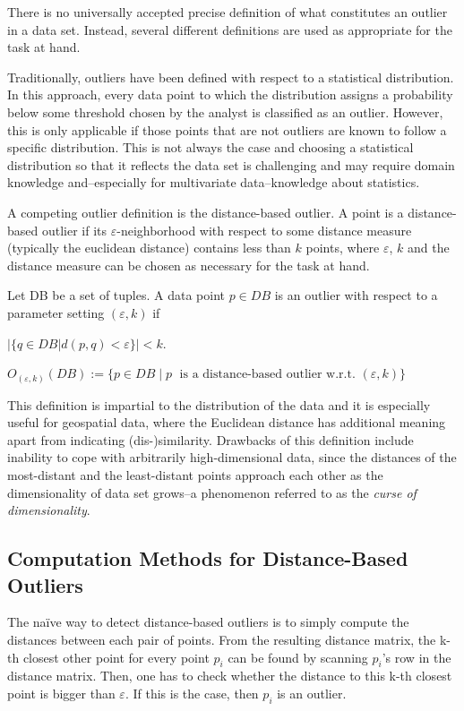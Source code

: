 \documentclass[runningheads]{llncs}
\begin{document}
There is no universally accepted precise definition of what constitutes an outlier in a data set\cite{kriegeldefinitions,outlier_definitions}. Instead, several different definitions are used as appropriate for the task at hand.

Traditionally, outliers have been defined with respect to a statistical distribution. In this approach, every data point to which the distribution assigns a probability below some threshold chosen by the analyst is classified as an outlier. However, this is only applicable if those points that are not outliers are known to follow a specific distribution. This is not always the case and choosing a statistical distribution so that it reflects the data set is challenging and may require domain knowledge and--especially for multivariate data--knowledge about statistics.

A competing outlier definition is the distance-based outlier. A point is a distance-based outlier if its $\varepsilon$-neighborhood with respect to some distance measure (typically the euclidean distance) contains less than $k$ points, where $\varepsilon$, $k$ and the distance measure can be chosen as necessary for the task at hand.

\begin{definition}
    Let DB be a set of tuples. A data point $p\in DB$ is an outlier with respect to a parameter setting $(\varepsilon,k)$ if

    $|\{q \in DB | d(p,q) < \varepsilon\}| < k$.

    $O_{(\varepsilon,k)}(DB) := \{p\in DB \;| \;p\;\text{ is a distance-based outlier w.r.t. }(\varepsilon,k) \}$
\end{definition}

This definition is impartial to the distribution of the data and it is especially useful for geospatial data, where the Euclidean distance has additional meaning apart from indicating (dis-)similarity. Drawbacks of this definition include inability to cope with arbitrarily high-dimensional data, since the distances of the most-distant and the least-distant points approach each other as the dimensionality of data set grows--a phenomenon referred to as the \emph{curse of dimensionality}\cite{curse_of_dimensionality}.
\subsection{Computation Methods for Distance-Based Outliers}

The na{\"i}ve way to detect distance-based outliers is to simply compute the distances between each pair of points. From the resulting distance matrix, the k-th closest other point for every point $p_i$ can be found by scanning $p_i$'s row in the distance matrix. Then, one has to check whether the distance to this k-th closest point is bigger than $\varepsilon$. If this is the case, then $p_i$ is an outlier.
\end{document}
